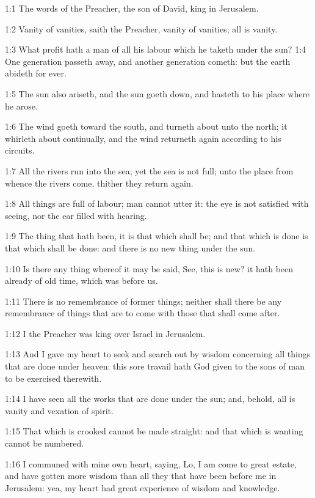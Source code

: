 
1:1 The words of the Preacher, the son of David, king in Jerusalem.

1:2 Vanity of vanities, saith the Preacher, vanity of vanities; all is vanity.

1:3 What profit hath a man of all his labour which he taketh under the sun?  1:4 One generation passeth away, and another generation cometh: but the earth abideth for ever.

1:5 The sun also ariseth, and the sun goeth down, and hasteth to his place where he arose.

1:6 The wind goeth toward the south, and turneth about unto the north; it whirleth about continually, and the wind returneth again according to his circuits.

1:7 All the rivers run into the sea; yet the sea is not full; unto the place from whence the rivers come, thither they return again.

1:8 All things are full of labour; man cannot utter it: the eye is not satisfied with seeing, nor the ear filled with hearing.

1:9 The thing that hath been, it is that which shall be; and that which is done is that which shall be done: and there is no new thing under the sun.

1:10 Is there any thing whereof it may be said, See, this is new? it hath been already of old time, which was before us.

1:11 There is no remembrance of former things; neither shall there be any remembrance of things that are to come with those that shall come after.

1:12 I the Preacher was king over Israel in Jerusalem.

1:13 And I gave my heart to seek and search out by wisdom concerning all things that are done under heaven: this sore travail hath God given to the sons of man to be exercised therewith.

1:14 I have seen all the works that are done under the sun; and, behold, all is vanity and vexation of spirit.

1:15 That which is crooked cannot be made straight: and that which is wanting cannot be numbered.

1:16 I communed with mine own heart, saying, Lo, I am come to great estate, and have gotten more wisdom than all they that have been before me in Jerusalem: yea, my heart had great experience of wisdom and knowledge.

